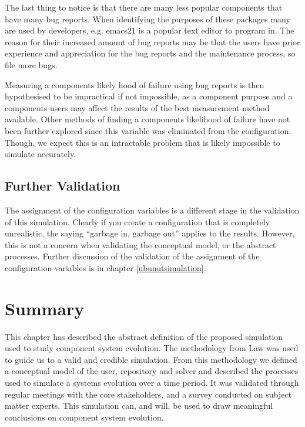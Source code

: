 The last thing to notice is that there are many less popular components that have many bug reports.
When identifying the purposes of these packages many are used by developers, e.g. emacs21 is a popular text editor to program in.
The reason for their increased amount of bug reports may be that the users have prior experience and appreciation for the bug reports and the maintenance process, so file more bugs.

Measuring a components likely hood of failure using bug reports is then hypothesised to be impractical if not impossible,
as a component purpose and a components users may affect the results of the best measurement method available.
Other methods of finding a components likelihood of failure have not been further explored since this variable was eliminated from the configuration.
Though, we expect this is an intractable problem that is likely impossible to simulate accurately.

\subsection{Further Validation}
The assignment of the configuration variables is a different stage in the validation of this simulation.
Clearly if you create a configuration that is completely unrealistic, the saying ``garbage in, garbage out'' applies to the results.
However, this is not a concern when validating the conceptual model, or the abstract processes.
Further discussion of the validation of the assignment of the configuration variables is in chapter \ref{ubunutsimulation}.

\section{Summary}
{}This chapter has described the abstract definition of the proposed simulation used to study component system evolution.
{}The methodology from Law \cite{Law2005} was used to guide us to a valid and credible simulation.
{}From this methodology we defined a conceptual model of the user, repository and solver and described the processes used to simulate a systems evolution over a time period.
{}It was validated through regular meetings with the core stakeholders, and a survey conducted on subject matter experts.
{}This simulation can, and will, be used to draw meaningful conclusions on component system evolution.
